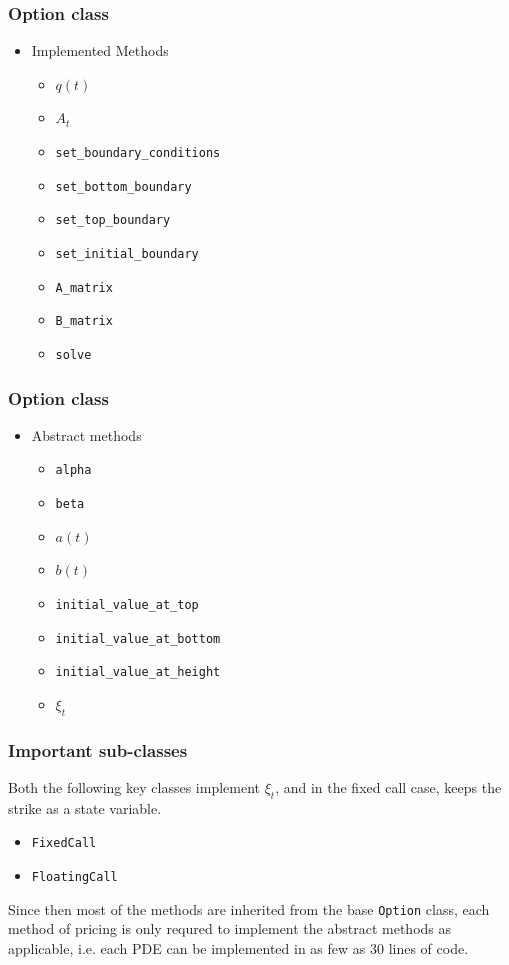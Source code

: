 \documentclass{beamer}
\begin{document}
  \begin{frame}
    \frametitle{Option class}
    \begin{itemize}
      \item Implemented Methods
      \begin{itemize}
        \item \(q(t)\)
        \item \(A_t\)
        \item \texttt{set\_boundary\_conditions}
        \item \texttt{set\_bottom\_boundary}
        \item \texttt{set\_top\_boundary}
        \item \texttt{set\_initial\_boundary}
        \item \texttt{A\_matrix}
        \item \texttt{B\_matrix}
        \item \texttt{solve}
      \end{itemize}
    \end{itemize}
  \end{frame}

  \begin{frame}
    \frametitle{Option class}
    \begin{itemize}
      \item Abstract methods
      \begin{itemize}
        \item \texttt{alpha}
        \item \texttt{beta}
        \item \( a(t) \)
        \item \( b(t) \)
        \item \texttt{initial\_value\_at\_top}
        \item \texttt{initial\_value\_at\_bottom}
        \item \texttt{initial\_value\_at\_height}
        \item \(\xi_t\)
      \end{itemize}
    \end{itemize}
  \end{frame}

  \begin{frame}
    \frametitle{Important sub-classes}
    Both the following key classes implement \(\xi_t\), and in the fixed call case, keeps the strike as a state variable.
    \begin{itemize}
      \item \texttt{FixedCall}
      \item \texttt{FloatingCall}
    \end{itemize}
    Since then most of the methods are inherited from the base \texttt{Option} class, each method of pricing is only requred to implement the abstract methods as applicable, i.e. each PDE can be implemented in as few as 30 lines of code.
  \end{frame}
\end{document}
